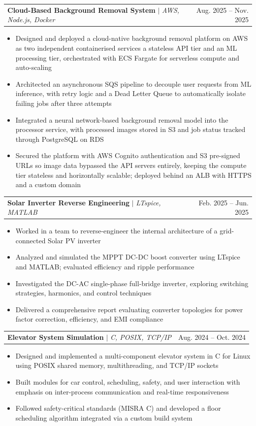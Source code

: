 \documentclass[letterpaper,11pt]{article}
\makeatletter
\newcommand{\resumeItem}[1]{
  \item\small{
    {#1 \vspace{-1pt}}
  }
}
\newcommand{\resumeProjectHeading}[2]{
    \item
    \begin{tabular*}{\textwidth}{l@{\extracolsep{\fill}}r}
      #1 & {\color{dark-grey}\small #2} \\
    \end{tabular*}\vspace{-4pt}
}
\newcommand{\resumeItemListStart}{\begin{itemize}}
\newcommand{\resumeItemListEnd}{\end{itemize}\vspace{0pt}}
\makeatother
\begin{document}
      \resumeProjectHeading
          {\textbf{Cloud-Based Background Removal System} $|$ \emph{AWS, Node.js, Docker}}{Aug. 2025 -- Nov. 2025}
          \resumeItemListStart
            \resumeItem{Designed and deployed a cloud-native background removal platform on AWS as two independent containerised services a stateless API tier and an ML processing tier, orchestrated with ECS Fargate for serverless compute and auto-scaling}
            \resumeItem{Architected an asynchronous SQS pipeline to decouple user requests from ML inference, with retry logic and a Dead Letter Queue to automatically isolate failing jobs after three attempts}
            \resumeItem{Integrated a neural network-based background removal model into the processor service, with processed images stored in S3 and job status tracked through PostgreSQL on RDS}
            \resumeItem{Secured the platform with AWS Cognito authentication and S3 pre-signed URLs so image data bypassed the API servers entirely, keeping the compute tier stateless and horizontally scalable; deployed behind an ALB with HTTPS and a custom domain}
          \resumeItemListEnd

      \resumeProjectHeading
          {\textbf{Solar Inverter Reverse Engineering} $|$ \emph{LTspice, MATLAB}}{Feb. 2025 -- Jun. 2025}
          \resumeItemListStart
            \resumeItem{Worked in a team to reverse-engineer the internal architecture of a grid-connected Solar PV inverter}
            \resumeItem{Analyzed and simulated the MPPT DC-DC boost converter using LTspice and MATLAB; evaluated efficiency and ripple performance}
            \resumeItem{Investigated the DC-AC single-phase full-bridge inverter, exploring switching strategies, harmonics, and control techniques}
            \resumeItem{Delivered a comprehensive report evaluating converter topologies for power factor correction, efficiency, and EMI compliance}
          \resumeItemListEnd

      \resumeProjectHeading
          {\textbf{Elevator System Simulation} $|$ \emph{C, POSIX, TCP/IP}}{Aug. 2024 -- Oct. 2024}
          \resumeItemListStart
            \resumeItem{Designed and implemented a multi-component elevator system in C for Linux using POSIX shared memory, multithreading, and TCP/IP sockets}
            \resumeItem{Built modules for car control, scheduling, safety, and user interaction with emphasis on inter-process communication and real-time responsiveness}
            \resumeItem{Followed safety-critical standards (MISRA C) and developed a floor scheduling algorithm integrated via a custom build system}
          \resumeItemListEnd
\end{document}
